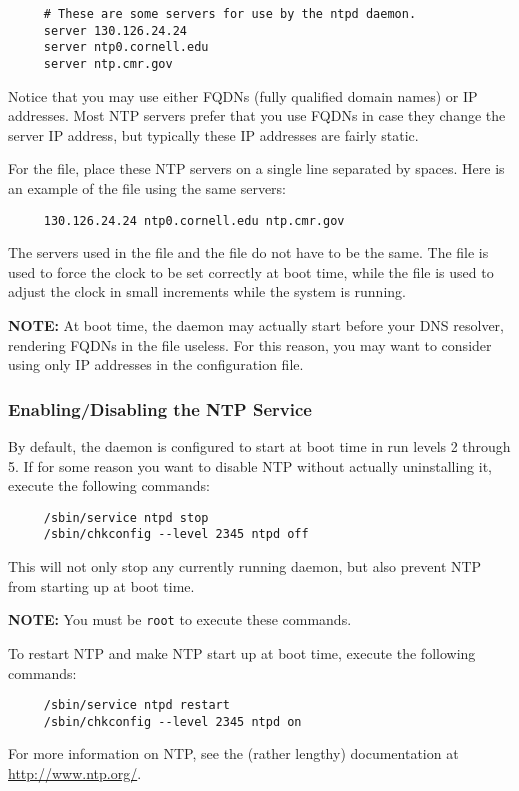 \begin{verbatim}
     # These are some servers for use by the ntpd daemon.
     server 130.126.24.24
     server ntp0.cornell.edu
     server ntp.cmr.gov
\end{verbatim}

Notice that you may use either FQDNs (fully qualified domain names) or IP
addresses.  Most NTP servers prefer that you use FQDNs in case they change
the server IP address, but typically these IP addresses are fairly static.

For the  file, place these NTP servers on a
single line separated by spaces.  Here is an example of the
 file using the same servers:

\begin{verbatim}
     130.126.24.24 ntp0.cornell.edu ntp.cmr.gov
\end{verbatim}

The servers used in the  file and the
 file do not have to be the same.  The
 file is used to force the clock to be set
correctly at boot time, while the  file is used to
adjust the clock in small increments while the system is running.

\bigskip 

{\bf NOTE:} At boot time, the  daemon may actually start before
your DNS resolver, rendering FQDNs in the  file
useless.  For this reason, you may want to consider using only IP addresses
in the  configuration file.

\subsubsection{Enabling/Disabling the NTP Service}

By default, the  daemon is configured to start at boot time in
run levels 2 through 5.  If for some reason you want to disable NTP without
actually uninstalling it, execute the following commands:

\begin{verbatim}
     /sbin/service ntpd stop
     /sbin/chkconfig --level 2345 ntpd off
\end{verbatim}

This will not only stop any currently running  daemon, but also
prevent NTP from starting up at boot time.

\bigskip 

{\bf NOTE:} You must be {\tt root} to execute these commands.

\bigskip 

To restart NTP and make NTP start up at boot time, execute the following
commands:

\begin{verbatim}
     /sbin/service ntpd restart
     /sbin/chkconfig --level 2345 ntpd on
\end{verbatim}

For more information on NTP, see the (rather lengthy) documentation at 
\url{http://www.ntp.org/}.



